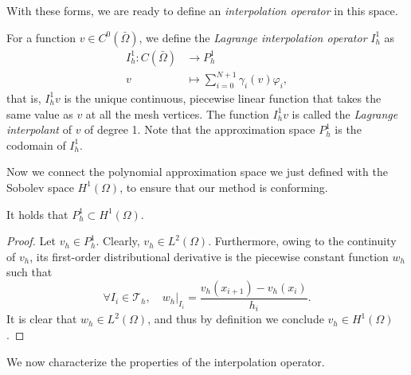 With these forms, we are ready to define an \emph{interpolation operator} in this space. 
\begin{definition}\label{def:interpolation-operator-Ph1}
    For a function $v\in C^0(\bar{\Omega})$, we define the \emph{Lagrange interpolation operator} $I_h^1$ as 
    \begin{equation}\label{eq:interpolation-operator-Ph1}
        \begin{aligned}
            I_h^1: C(\bar{\Omega}) &\to P_h^1\\
            v &\mapsto \sum_{i=0}^{N+1} \gamma_i(v) \varphi_i,
        \end{aligned}
    \end{equation}
    that is, $I_h^1 v$ is the unique continuous, piecewise linear function that takes the same value as $v$ at all the mesh vertices. The function $I_h^1 v$ is called the \emph{Lagrange interpolant} of $v$ of degree 1. Note that the approximation space $P_h^1$ is the codomain of $I_h^1$. 
\end{definition}
Now we connect the polynomial approximation space we just defined with the Sobolev space $H^1(\Omega)$, to ensure that our method is conforming. 
\begin{lemma}\label{lemma:approxP1}
    It holds that $P_h^1 \subset H^1(\Omega)$.
    \begin{proof}
        Let $v_h \in P_h^1$. Clearly, $v_h \in L^2(\Omega)$. Furthermore, owing to the continuity of $v_h$, its first-order distributional derivative is the piecewise constant function $w_h$ such that
        \begin{equation*}
            \forall I_i \in \mathcal{T}_h,\quad  w_h|_{I_i} = \frac{v_h(x_{i+1}) - v_h(x_i)}{h_i}.
        \end{equation*}
        It is clear that $w_h\in L^2(\Omega)$, and thus by definition we conclude $v_h\in H^1(\Omega)$.
    \end{proof}
\end{lemma}
We now characterize the properties of the interpolation operator. 
